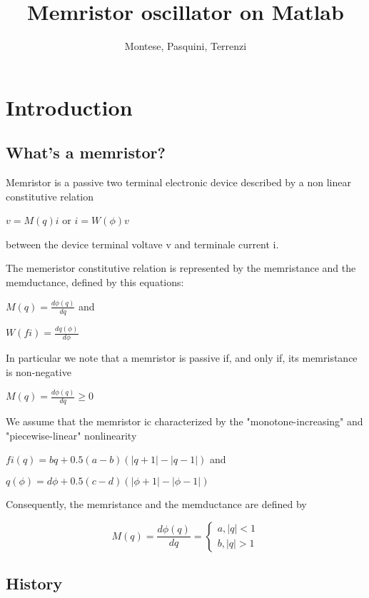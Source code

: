 \documentclass[12pt, a4paper]{book}
\begin{document}
\author{Montese, Pasquini, Terrenzi}

\title{Memristor oscillator on Matlab}
\maketitle

\tableofcontents
\newpage


\section{Introduction}
\subsection{What's a memristor?}


Memristor is a passive two terminal electronic device described by a non linear
constitutive relation

                     $v=M(q)i$ or $i=W(\phi)v$

 between the device terminal voltave v and 
terminale current i.

The memeristor constitutive relation is represented by the memristance and the
memductance, defined by this equations: 

$M(q) = \frac{d\phi(q)}{dq} $ and

$ W(fi)=\frac{dq(\phi)}{d\phi}$

In particular we note that a memristor is passive if, and only if, its 
memristance is non-negative 

$M(q)=\frac{d\phi(q)}{dq}\geq 0$

We assume that the memristor ic characterized by the "monotone-increasing" and
"piecewise-linear" nonlinearity 

$fi(q)=bq+0.5(a-b)(|q+1|-|q-1|)$ and 

$q(\phi)=d\phi+0.5(c-d)(|\phi+1|-|\phi-1|)$

 Consequently, the memristance and the memductance are defined by 
 
\begin{equation}
M(q)=\frac{d\phi(q)}{dq}=
\begin{cases}
a, |q|<1
\\
b, |q|>1
\end{cases}
\end{equation}

\subsection{History}
\end{document}
